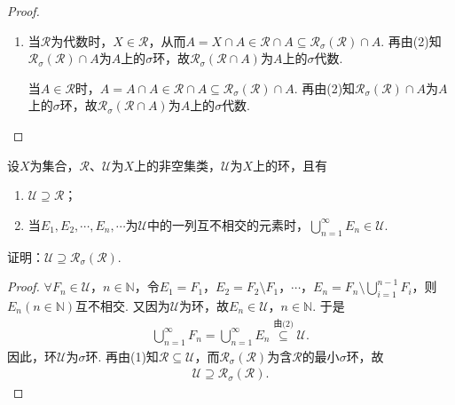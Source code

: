\documentclass[../../main.tex]{subfiles}%
\begin{document}
\begin{proof}
\begin{enumerate}[(1)]
{\color{blue}证法二:}
\begin{align*}
\mathscr{R}_\sigma(\mathscr{R})\cap A&=\{\mathscr{R}\text{中至多可数个元素}E_1,E_2,\cdots,E_n,\cdots\text{的至多可数次“$\cup$”、“$\setminus$”运算后所得集与}A\text{的交}\} \\
&=\{\mathscr{R}\cap A\text{中至多可数个元素}E_1\cap A,E_2\cap A,\cdots,E_n\cap A,\cdots\text{的至多可数次“$\cup$”、“$\setminus$”运算后所得的集}\} \\
&=\mathscr{R}_\sigma(\mathscr{R}\cap A).
\end{align*}

\item 当$\mathscr{R}$为代数时，$X\in\mathscr{R}$，从而$A=X\cap A\in\mathscr{R}\cap A\subseteq\mathscr{R}_\sigma(\mathscr{R})\cap A$. 再由(2)知$\mathscr{R}_\sigma(\mathscr{R})\cap A$为$A$上的$\sigma$环，故$\mathscr{R}_\sigma(\mathscr{R}\cap A)$为$A$上的$\sigma$代数.

当$A\in\mathscr{R}$时，$A=A\cap A\in\mathscr{R}\cap A\subseteq\mathscr{R}_\sigma(\mathscr{R})\cap A$. 再由(2)知$\mathscr{R}_\sigma(\mathscr{R})\cap A$为$A$上的$\sigma$环，故$\mathscr{R}_\sigma(\mathscr{R}\cap A)$为$A$上的$\sigma$代数.
\end{enumerate}

\end{proof}

\begin{example}
设$X$为集合，$\mathscr{R}$、$\mathscr{U}$为$X$上的非空集类，$\mathscr{U}$为$X$上的环，且有
\begin{enumerate}[(1)]
\item $\mathscr{U}\supseteq\mathscr{R}$；
\item 当$E_1,E_2,\cdots,E_n,\cdots$为$\mathscr{U}$中的一列互不相交的元素时，$\bigcup_{n=1}^{\infty}E_n\in\mathscr{U}$.
\end{enumerate}
证明：$\mathscr{U}\supseteq\mathscr{R}_\sigma(\mathscr{R})$.
\end{example}
\begin{proof}

$\forall F_n\in\mathscr{U}$，$n\in\mathbb{N}$，令$E_1=F_1$，$E_2=F_2\setminus F_1$，$\cdots$，$E_n=F_n\setminus\bigcup_{i=1}^{n-1}F_i$，则$E_n(n\in\mathbb{N})$互不相交. 又因为$\mathscr{U}$为环，故$E_n\in\mathscr{U}$，$n\in\mathbb{N}$. 于是
\begin{align*}
\bigcup_{n=1}^{\infty}F_n=\bigcup_{n=1}^{\infty}E_n\stackrel{\text{由(2)}}{\subseteq}\mathscr{U}.
\end{align*}
因此，环$\mathscr{U}$为$\sigma$环. 再由(1)知$\mathscr{R}\subseteq\mathscr{U}$，而$\mathscr{R}_\sigma(\mathscr{R})$为含$\mathscr{R}$的最小$\sigma$环，故
\begin{align*}
\mathscr{U}\supseteq\mathscr{R}_\sigma(\mathscr{R}).
\end{align*}

\end{proof}
\end{document}
